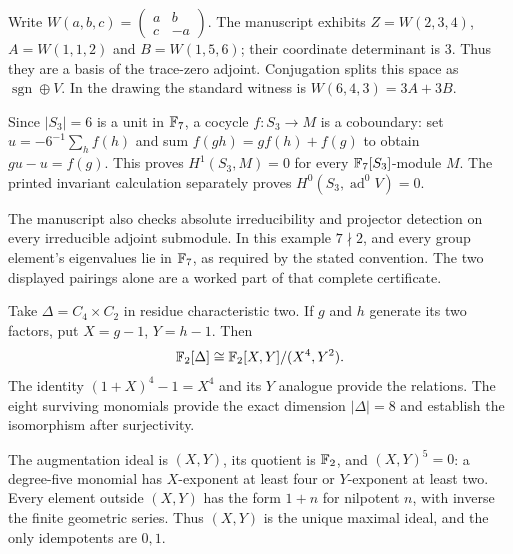 Write $W(a,b,c)=\left(\begin{smallmatrix}a&b\\c&-a\end{smallmatrix}\right)$. The manuscript exhibits $Z=W(2,3,4)$, $A=W(1,1,2)$ and $B=W(1,5,6)$; their coordinate determinant is $3$. Thus they are a basis of the trace-zero adjoint. Conjugation splits this space as $\operatorname{sgn}\oplus V$. In the drawing the standard witness is $W(6,4,3)=3A+3B$.

Since $|S_3|=6$ is a unit in $\mathbb F_7$, a cocycle $f:S_3\to M$ is a coboundary: set $u=-6^{-1}\sum_h f(h)$ and sum $f(gh)=g f(h)+f(g)$ to obtain $gu-u=f(g)$. This proves $H^1(S_3,M)=0$ for every $\mathbb F_7[S_3]$-module $M$. The printed invariant calculation separately proves $H^0(S_3,\operatorname{ad}^0V)=0$.

The manuscript also checks absolute irreducibility and projector detection on every irreducible adjoint submodule. In this example $7\nmid2$, and every group element's eigenvalues lie in $\mathbb F_7$, as required by the stated convention. The two displayed pairings alone are a worked part of that complete certificate.


Take $\Delta=C_4\times C_2$ in residue characteristic two. If $g$ and $h$ generate its two factors, put $X=g-1$, $Y=h-1$. Then
\[
\mathbb F_2[\Delta]\cong\mathbb F_2[X,Y]/(X^4,Y^2).
\]
The identity $(1+X)^4-1=X^4$ and its $Y$ analogue provide the relations. The eight surviving monomials provide the exact dimension $|\Delta|=8$ and establish the isomorphism after surjectivity.


The augmentation ideal is $(X,Y)$, its quotient is $\mathbb F_2$, and $(X,Y)^5=0$: a degree-five monomial has $X$-exponent at least four or $Y$-exponent at least two. Every element outside $(X,Y)$ has the form $1+n$ for nilpotent $n$, with inverse the finite geometric series. Thus $(X,Y)$ is the unique maximal ideal, and the only idempotents are $0,1$.

